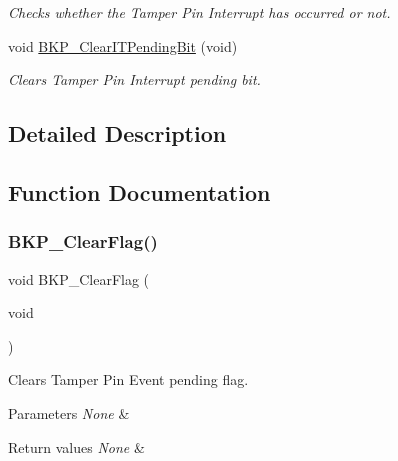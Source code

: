 \begin{DoxyCompactItemize}
\begin{DoxyCompactList}\small\item\em Checks whether the Tamper Pin Interrupt has occurred or not. \end{DoxyCompactList}\item 
void \mbox{\hyperlink{group___b_k_p___private___functions_ga6a93ef8e40959bb10fea670e2040ad74}{B\+K\+P\+\_\+\+Clear\+I\+T\+Pending\+Bit}} (void)
\begin{DoxyCompactList}\small\item\em Clears Tamper Pin Interrupt pending bit. \end{DoxyCompactList}\end{DoxyCompactItemize}


\subsection{Detailed Description}


\subsection{Function Documentation}
\mbox{\label{group___b_k_p___private___functions_ga3f3aea5b0a3d8d5d79b0b506928351ea}} 
\subsubsection{\texorpdfstring{BKP\_ClearFlag()}{BKP\_ClearFlag()}}
{\footnotesize\ttfamily void B\+K\+P\+\_\+\+Clear\+Flag (\begin{DoxyParamCaption}\item[{void}]{ }\end{DoxyParamCaption})}



Clears Tamper Pin Event pending flag. 


\begin{DoxyParams}{Parameters}
{\em None} & \\
\hline
\end{DoxyParams}

\begin{DoxyRetVals}{Return values}
{\em None} & \\
\hline
\end{DoxyRetVals}
\mbox{\label{group___b_k_p___private___functions_ga6a93ef8e40959bb10fea670e2040ad74}} 
